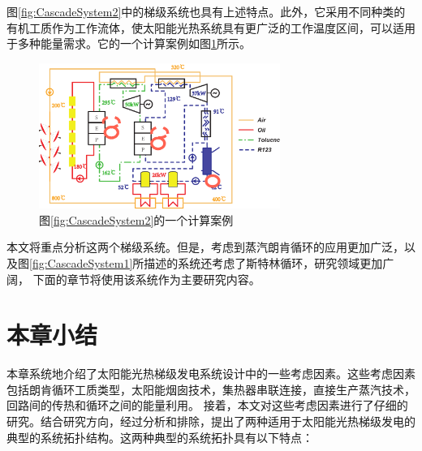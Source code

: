 图\ref{fig:CascadeSystem2}中的梯级系统也具有上述特点。此外，它采用不同种类的有机工质作为工作流体，使太阳能光热系统具有更广泛的工作温度区间，可以适用于多种能量需求。它的一个计算案例如图\ref{fig:Ex_CascadeSystem2}所示。
\begin{figure}[htbp]
\centering 
\includegraphics[width=0.7\textwidth]{fig/Ex_CascadeSystem2}
\caption{图\ref{fig:CascadeSystem2}的一个计算案例}
\label{fig:Ex_CascadeSystem2}
\end{figure}
本文将重点分析这两个梯级系统。但是，考虑到蒸汽朗肯循环的应用更加广泛，以及图\ref{fig:CascadeSystem1}所描述的系统还考虑了斯特林循环，研究领域更加广阔，
下面的章节将使用该系统作为主要研究内容。

\newpage
\section{本章小结}
本章系统地介绍了太阳能光热梯级发电系统设计中的一些考虑因素。这些考虑因素包括朗肯循环工质类型，太阳能烟囱技术，集热器串联连接，直接生产蒸汽技术，回路间的传热和循环之间的能量利用。
接着，本文对这些考虑因素进行了仔细的研究。结合研究方向，经过分析和排除，提出了两种适用于太阳能光热梯级发电的典型的系统拓扑结构。这两种典型的系统拓扑具有以下特点：

